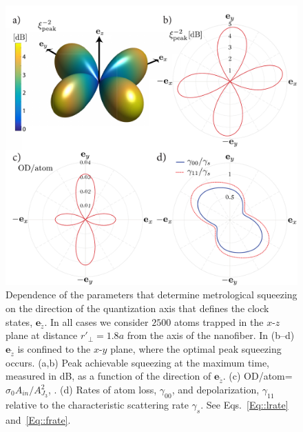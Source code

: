 \documentclass[aps,pra,twocolumn]{revtex4-1} %
\newcommand{\qaxis}{\mathbf{e}_{\tilde{z}}}
\begin{document}
\begin{figure}
\includegraphics[scale=0.37]{./Fig5}
\caption{Dependence of the parameters that determine metrological squeezing  on the direction of the quantization axis that defines the clock states, $\qaxis$.  In all cases we consider $2500$ atoms trapped in the $x$-$z$ plane at distance $ r'\!_\perp=1.8a$ from the axis of the nanofiber. 
In (b--d) $\qaxis$ is confined to the $x$-$y$ plane, where the optimal peak squeezing occurs.
(a,b)  Peak achievable squeezing at the maximum time, measured in dB, as a function of the direction of  $\qaxis$. 
(c) OD/atom=$\sigma_0 A_{in}/A^2_{J_3}$, .
(d) Rates of atom loss, $\gamma_{00}$, and depolarization, $\gamma_{11}$ relative to the characteristic scattering rate $\gamma_s$.  See Eqs.~\eqref{Eq::lrate} and~\eqref{Eq::frate}. }\label{Fig::Squeezing_QuantizationAxis}
\end{figure}
\end{document}
